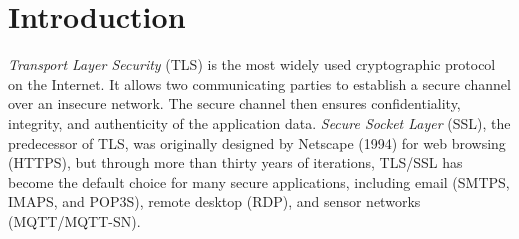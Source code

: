 \documentclass[letterpaper,12pt,titlepage,oneside,final]{book}
\let\origdoublepage\cleardoublepage
\newcommand{\clearemptydoublepage}{%
  \clearpage{\pagestyle{empty}\origdoublepage}}
\let\cleardoublepage\clearemptydoublepage
\begin{document}
\cleardoublepage
{}    %





\renewcommand\contentsname{Table of Contents}
\tableofcontents
\cleardoublepage
{}    %

\listoffigures
\cleardoublepage
{}		%

\listoftables
\cleardoublepage
{}		%

\renewcommand*{\abbreviationsname}{List of Abbreviations}
\printglossary[type=abbreviations]
\cleardoublepage
{}		%

\printglossary[type=symbols]
\cleardoublepage
{}		%



\chapter{Introduction}\label{sec:introduction}
\emph{Transport Layer Security} (TLS) is the most widely used cryptographic protocol on the Internet.
It allows two communicating parties to establish a secure channel over an insecure network.
The secure channel then ensures confidentiality, integrity, and authenticity of the application data.
\emph{Secure Socket Layer} (SSL), the predecessor of TLS, was originally designed by Netscape (1994) for web browsing (HTTPS), but through more than thirty years of iterations, TLS/SSL has become the default choice for many secure applications, including email (SMTPS, IMAPS, and POP3S), remote desktop (RDP), and sensor networks (MQTT/MQTT-SN).
\end{document}
